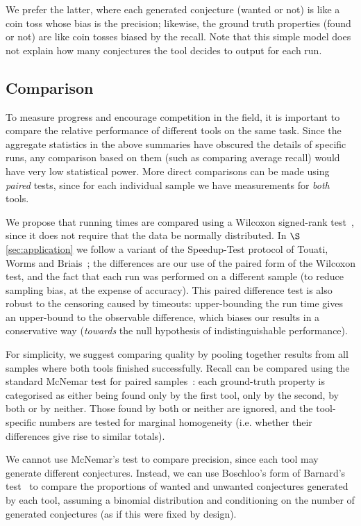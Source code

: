 We prefer the latter, where each generated conjecture (wanted or not) is like a
coin toss whose bias is the precision; likewise, the ground truth properties
(found or not) are like coin tosses biased by the recall. Note that this simple
model does not explain how many conjectures the tool decides to output for each
run.

\subsection{Comparison}

To measure progress and encourage competition in the field, it is important to
compare the relative performance of different tools on the same task. Since the
aggregate statistics in the above summaries have obscured the details of
specific runs, any comparison based on them (such as comparing average recall)
would have very low statistical power. More direct comparisons can be made using
\emph{paired} tests, since for each individual sample we have measurements for
\emph{both} tools.

We propose that running times are compared using a Wilcoxon signed-rank
test~\cite{wilcoxon1945individual}, since it does not require that the data be
normally distributed. In $\S$\ref{sec:application} we follow a variant of the
Speedup-Test protocol of Touati, Worms and Briais~\cite{touati2013speedup}; the
differences are our use of the paired form of the Wilcoxon test, and the fact
that each run was performed on a different sample (to reduce sampling bias, at
the expense of accuracy). This paired difference test is also robust to the
censoring caused by timeouts: upper-bounding the run time gives an upper-bound
to the observable difference, which biases our results in a conservative way
(\emph{towards} the null hypothesis of indistinguishable performance).

For simplicity, we suggest comparing quality by pooling together results from
all samples where both tools finished successfully. Recall can be compared using
the standard McNemar test for paired samples~\cite{mcnemar1947note}: each
ground-truth property is categorised as either being found only by the first
tool, only by the second, by both or by neither. Those found by both or neither
are ignored, and the tool-specific numbers are tested for marginal homogeneity
(i.e. whether their differences give rise to similar totals).

We cannot use McNemar's test to compare precision, since each tool may generate
different conjectures. Instead, we can use Boschloo's form of Barnard's
test~\cite{lydersen2009recommended} to compare the proportions of wanted and
unwanted conjectures generated by each tool, assuming a binomial distribution
and conditioning on the number of generated conjectures (as if this were fixed
by design).

